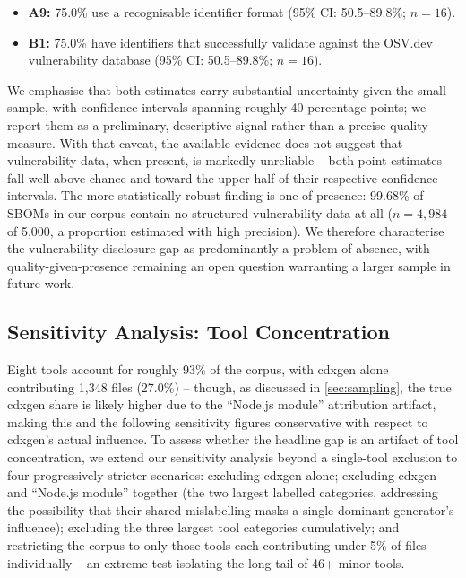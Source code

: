 \documentclass[11pt]{article}
\begin{document}
\begin{itemize}
\item \textbf{A9:} 75.0\% use a recognisable identifier format (95\% CI: 50.5--89.8\%; $n=16$).
\item \textbf{B1:} 75.0\% have identifiers that successfully validate against the OSV.dev vulnerability database (95\% CI: 50.5--89.8\%; $n=16$).
\end{itemize}

We emphasise that both estimates carry substantial uncertainty given the small sample, with confidence intervals spanning roughly 40 percentage points; we report them as a preliminary, descriptive signal rather than a precise quality measure. With that caveat, the available evidence does not suggest that vulnerability data, when present, is markedly unreliable -- both point estimates fall well above chance and toward the upper half of their respective confidence intervals. The more statistically robust finding is one of presence: 99.68\% of SBOMs in our corpus contain no structured vulnerability data at all ($n=4{,}984$ of 5,000, a proportion estimated with high precision). We therefore characterise the vulnerability-disclosure gap as predominantly a problem of absence, with quality-given-presence remaining an open question warranting a larger sample in future work.

\subsection{Sensitivity Analysis: Tool Concentration}
\label{sec:sensitivity}

Eight tools account for roughly 93\% of the corpus, with cdxgen alone contributing 1,348 files (27.0\%) -- though, as discussed in \cref{sec:sampling}, the true cdxgen share is likely higher due to the ``Node.js module'' attribution artifact, making this and the following sensitivity figures conservative with respect to cdxgen's actual influence. To assess whether the headline gap is an artifact of tool concentration, we extend our sensitivity analysis beyond a single-tool exclusion to four progressively stricter scenarios: excluding cdxgen alone; excluding cdxgen and ``Node.js module'' together (the two largest labelled categories, addressing the possibility that their shared mislabelling masks a single dominant generator's influence); excluding the three largest tool categories cumulatively; and restricting the corpus to only those tools each contributing under 5\% of files individually -- an extreme test isolating the long tail of 46+ minor tools.
\end{document}
